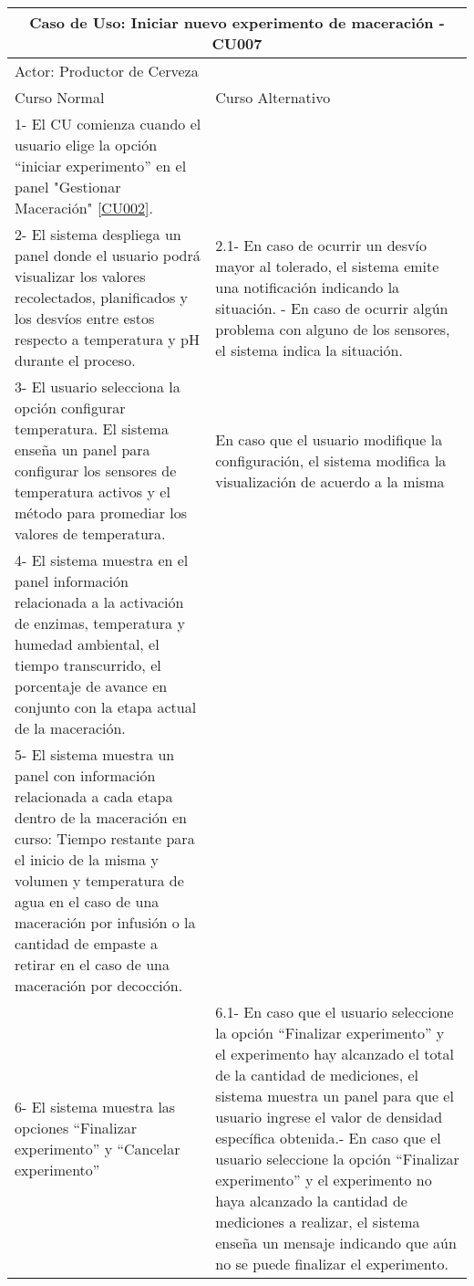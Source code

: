     
    \begin{table}[H]
    \begin{center}
    \begin{tabularx}{\textwidth}{ | X | X |}
        \hline
        \multicolumn{2}{|c|}{\textbf{Caso de Uso: Iniciar nuevo experimento de maceración - CU007}} \\
        \hline
        \multicolumn{2}{|l|}{Actor: Productor de Cerveza} \\
        \hline
        Curso Normal & Curso Alternativo \\
        \hline
        1- El CU comienza cuando el usuario elige la opción “iniciar experimento” en el panel "Gestionar Maceración" \ref{CU002}. & \\
        \hline
        2- El sistema despliega un panel donde el usuario podrá visualizar los valores recolectados, planificados y los desvíos entre estos respecto a temperatura y pH durante el proceso.  & 2.1- En caso de ocurrir un desvío mayor al tolerado, el sistema emite una notificación indicando la situación. \newline 2.2- En caso de ocurrir algún problema con alguno de los sensores, el sistema indica la situación.
        \\
        \hline
        3- El usuario selecciona la opción configurar temperatura. El sistema enseña un panel para configurar los sensores de temperatura activos y el método para promediar los valores de temperatura. & En caso que el usuario modifique la configuración, el sistema modifica la visualización de acuerdo a la misma\\ 
        \hline
        
        4- El sistema muestra en el panel información relacionada a la activación de enzimas, temperatura y humedad ambiental, el tiempo transcurrido, el porcentaje de avance en conjunto con la etapa actual de la maceración.& \\
        \hline
        
        5- El sistema muestra un panel con información relacionada a cada etapa dentro de la maceración en curso: Tiempo restante para el inicio de la misma y volumen y temperatura de agua en el caso de una maceración por infusión o la cantidad de empaste a retirar en el caso de una maceración por decocción. & \\
        \hline
        
        6- El sistema muestra las opciones ``Finalizar experimento'' y ``Cancelar experimento'' & 6.1- En caso que el usuario seleccione la opción ``Finalizar experimento'' y el experimento hay alcanzado el total de la cantidad de mediciones, el sistema muestra un panel para que el usuario ingrese el valor de densidad específica obtenida.\newline 6.2- En caso que el usuario seleccione la opción ``Finalizar experimento'' y el experimento no haya alcanzado la cantidad de mediciones a realizar, el sistema enseña un mensaje indicando que aún no se puede finalizar el experimento.\\ 
        \hline
        

\end{tabularx}
\end{center}
\end{table}
